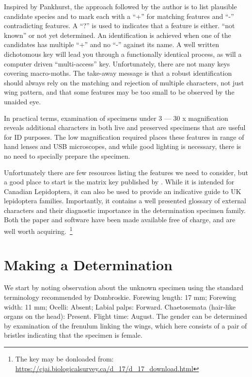 \documentclass[]{article}
\begin{document}
 Inspired by Pankhurst, the approach followed by the author is to list plausible candidate species and to mark each with a \enquote{+} for matching features and \enquote{-} contradicting features. A \enquote{?} is used to  indicates that a feature is either. \enquote{not known} or not yet determined. An identification is achieved when one of the candidates has multiple \enquote{+} and no \enquote{-} against its name.
 A well written dichotomous key will lead you through a functionally identical process, as will a computer driven \enquote{multi-access} key. Unfortunately, there are not many keys covering macro-moths.
 The take-away message is that a robust identification should always rely on the matching and rejection of multiple characters, not just wing pattern, and that some features  may be too small to be observed by the unaided eye.  
 
 In practical terms,  examination of specimens under  3 --- 30 x magnification reveals additional characters  in both live and preserved specimens that are useful for ID purposes. The low magnification required places these features in range of hand lenses and USB microscopes, and while good lighting is necessary, there is no need to specially prepare the specimen.
 
 Unfortunately there are few resources listing the features we need to consider, but a good place to start is the matrix key published by \cite{Dombroskie2011}. While it is intended for Canadian Lepidoptera, it can also be used to provide an indicative guide to UK lepidoptera families. Importantly, it contains a well presented glossary of external characters and their diagnostic importance in the determination specimen family. Both the paper and software have been made available free of charge, and are well worth acquiring.~\footnote{ The key may be donloaded from: \url{https://cjai.biologicalsurvey.ca/d_17/d_17_download.html}}
 
\section*{Making a Determination}
We start by noting observation about the unknown specimen using the standard terminology recommended by Dombroskie.
Forewing length: 17 mm; Forewing width: 11 mm;  Ocelli: Absent;  Labial palps: Forward. Chaetosemata (hair-like organs on the head):  Present. Flight time: August. The gender can be determined by examination of the frenulum linking the wings, which here consists of a pair of bristles indicating that the specimen is female.
\end{document}
